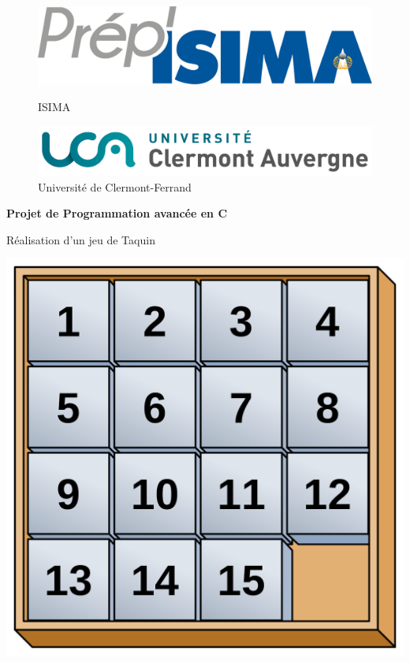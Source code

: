 \documentclass[a4paper]{article}
\begin{document}
\begin{titlepage}


  \begin{figure}[!htb]
    \begin{minipage}{0.5\textwidth}
      \centering
      \includegraphics[width=.7\linewidth]{./img_rapport/prepisima.png}
      \caption{ ISIMA }\label{fig-ISIMA}
    \end{minipage}\hfill
    \begin{minipage}{0.5\textwidth}
      \centering
      \includegraphics[width=.7\linewidth]{./img_rapport/logo.png}
      \caption{Université de Clermont-Ferrand}\label{fig-UCA}
    \end{minipage}
  \end{figure}

  \vspace{2cm}

  \begin{center}


    {\huge \bfseries Projet de Programmation avancée en C\\[0.4cm]}

    \vspace{0.5cm}
    
    {\huge Réalisation d'un jeu de Taquin}

    \vspace{1cm}

    \includegraphics[scale=0.2]{./img_rapport/taquin.png}


\end{center}
\end{titlepage}
\end{document}
